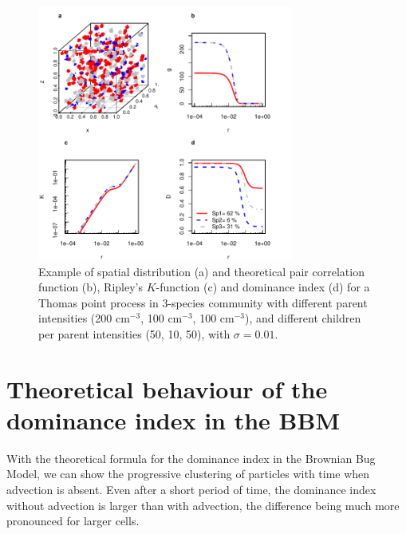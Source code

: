 \documentclass[english]{article}
\begin{document}
\begin{figure}[H]
\begin{centering}
\includegraphics[width=0.75\textwidth]{../code/figure/example_Thomas_distribution}
\par\end{centering}
\caption{Example of spatial distribution (a) and theoretical pair correlation
function (b), Ripley's $K$-function (c) and dominance index (d) for
a Thomas point process in 3-species community with different parent
intensities (200 cm$^{-3}$, 100 cm$^{-3}$, 100 cm$^{-3}$), and
different children per parent intensities (50, 10, 50), with $\sigma=0.01$.\label{fig:Example-Thomas}}
\end{figure}


\section{Theoretical behaviour of the dominance index in the BBM}

With the theoretical formula for the dominance index in the Brownian
Bug Model, we can show the progressive clustering of particles with
time when advection is absent. Even after a short period of time,
the dominance index without advection is larger than with advection,
the difference being much more pronounced for larger cells. 
\end{document}
